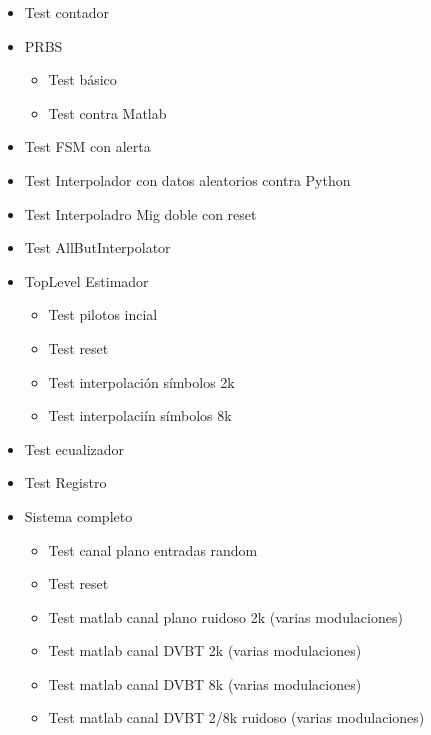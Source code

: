 \documentclass[11pt]{scrartcl} %
\begin{document}
\begin{preview}
\begin{itemize}
	\item Test contador
	\item PRBS
	\begin{itemize}
		\item Test básico
		\item Test contra Matlab
	\end{itemize}
	\item Test FSM con alerta
	\item Test Interpolador con datos aleatorios contra Python
	\item Test Interpoladro Mig doble con reset
	\item Test AllButInterpolator
	\item TopLevel Estimador
	\begin{itemize}
		\item Test pilotos incial
		\item Test reset
		\item Test interpolación símbolos 2k
		\item Test interpolaciín símbolos 8k
	\end{itemize}
	\item Test ecualizador
	\item Test Registro
	\item Sistema completo
	\begin{itemize}
		\item Test canal plano entradas random
		\item Test reset
		\item Test matlab canal plano ruidoso 2k (varias modulaciones)
		\item Test matlab canal DVBT 2k (varias modulaciones)
		\item Test matlab canal DVBT 8k (varias modulaciones)
		\item Test matlab canal DVBT 2/8k ruidoso (varias modulaciones)
	\end{itemize}
\end{itemize}

 
	

	

\end{preview}
\end{document}
